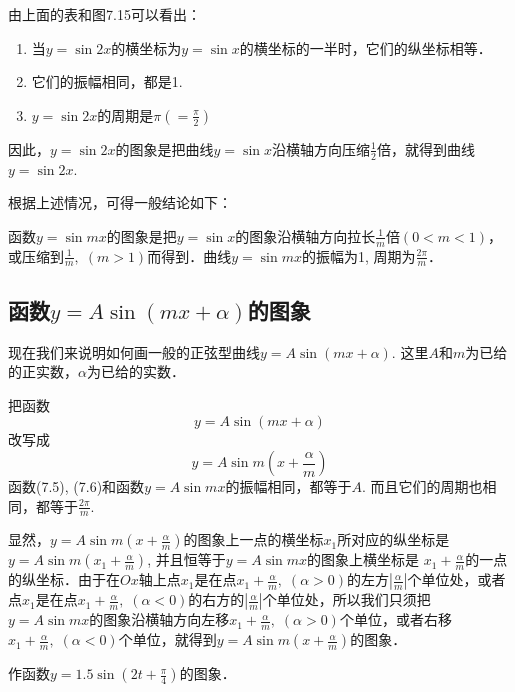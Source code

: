 由上面的表和图7.15可以看出：
\begin{enumerate}
    \item 当$y=\sin2x$的横坐标为$y=\sin x$的横坐标的一半时，它们的纵坐标相等．
    \item 它们的振幅相同，都是1.
    \item $y=\sin2x$的周期是$\pi\left(=\frac{\pi}{2}\right)$
\end{enumerate}

因此，$y=\sin2x$的图象是把曲线$y=\sin x$沿横轴方向压缩$\frac{1}{2}$倍，就得到曲线$y=\sin2x$.

根据上述情况，可得一般结论如下：

\begin{blk}{}
   函数$y=\sin mx$的图象是把$y=\sin x$的图象沿横轴方向拉长$\frac{1}{m}$倍$(0<m<1)$，或压缩到$\frac{1}{m},\; (m>1)$而得到．曲线$y=\sin mx$的振幅为1, 周期为$\frac{2\pi}{m}$． 
\end{blk}

\subsection{函数$y=A\sin(mx+\alpha)$的图象}

现在我们来说明如何画一般的正弦型曲线$y=A\sin(mx+\alpha)$. 这里$A$和$m$为已给的正实数，$\alpha$为已给的实数．

把函数
\begin{equation}
    y=A\sin(mx+\alpha)
\end{equation}
改写成
\begin{equation}
    y=A\sin m\left(x+\frac{\alpha}{m}\right)
\end{equation}
函数(7.5), (7.6)和函数$y=A\sin mx$的振幅相同，都等于$A$. 而且它们的周期也相同，都等于$\frac{2\pi}{m}$.

显然，$y=A\sin m\left(x+\frac{\alpha}{m}\right)$的图象上一点的横坐标$x_1$所对应的纵坐标是$y=A\sin m\left(x_1+\frac{\alpha}{m}\right)$, 并且恒等于$y=A\sin mx$的图象上横坐标是
$x_1+\frac{\alpha}{m}$的一点的纵坐标．由于在$Ox$轴上点$x_1$是在点$x_1+\frac{\alpha}{m},\;(\alpha>0)$的左方$\left|\frac{\alpha}{m}\right|$个单位处，或者点$x_1$是在点$x_1+\frac{\alpha}{m},\;(\alpha<0)$的右方的$\left|\frac{\alpha}{m}\right|$个单位处，所以我们只须把
$y=A\sin mx$的图象沿横轴方向左移$x_1+\frac{\alpha}{m},\;(\alpha>0)$个单位，或者右移$x_1+\frac{\alpha}{m},\;(\alpha<0)$个单位，就得到$y=A\sin m\left(x+\frac{\alpha}{m}\right)$的图象．

\begin{example}
作函数$y=1.5\sin \left(2t+\frac{\pi}{4}\right)$的图象．
\end{example}

